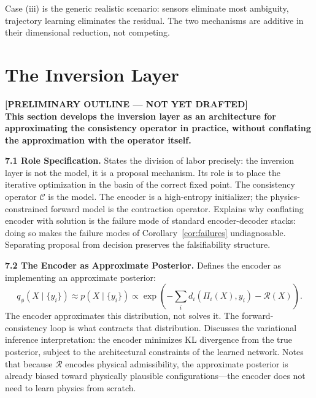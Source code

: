\documentclass[12pt, oneside]{article}
\newcommand{\preliminary}[1]{%
  \colorbox{yellow!20}{\parbox{\dimexpr\linewidth-2\fboxsep}{%
    \textbf{\textcolor{red!70!black}{[PRELIMINARY OUTLINE --- NOT YET DRAFTED]}}\\[4pt]
    #1
  }}%
}
\begin{document}
Case (iii) is the generic realistic scenario: sensors eliminate most ambiguity, trajectory
learning eliminates the residual. The two mechanisms are additive in their dimensional
reduction, not competing.

\section{The Inversion Layer}
\label{sec:inversion}

\preliminary{
\textbf{This section develops the inversion layer as an architecture for approximating the
consistency operator in practice, without conflating the approximation with the operator
itself.}

\medskip
\textbf{7.1 Role Specification.}
States the division of labor precisely: the inversion layer is not the model, it is a
proposal mechanism. Its role is to place the iterative optimization in the basin of the
correct fixed point. The consistency operator $\mathcal{C}$ is the model. The encoder is
a high-entropy initializer; the physics-constrained forward model is the contraction
operator. Explains why conflating encoder with solution is the failure mode of standard
encoder-decoder stacks: doing so makes the failure modes of Corollary~\ref{cor:failures}
undiagnosable. Separating proposal from decision preserves the falsifiability structure.

\medskip
\textbf{7.2 The Encoder as Approximate Posterior.}
Defines the encoder as implementing an approximate posterior:
\[
q_\phi(X \mid \{y_i\}) \approx p(X \mid \{y_i\}) \propto
\exp\!\left(-\sum_i d_i(\Pi_i(X), y_i) - \mathcal{R}(X)\right).
\]
The encoder approximates this distribution, not solves it. The forward-consistency loop
is what contracts that distribution. Discusses the variational inference interpretation:
the encoder minimizes KL divergence from the true posterior, subject to the architectural
constraints of the learned network. Notes that because $\mathcal{R}$ encodes physical
admissibility, the approximate posterior is already biased toward physically plausible
configurations---the encoder does not need to learn physics from scratch.

}
\end{document}
